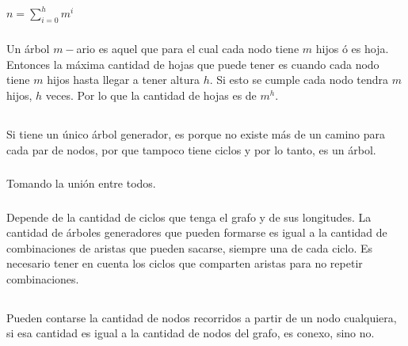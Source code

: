 \subsubsection{}
$n = \sum_{i = 0}^{h}m^i$

\subsubsection{}
Un árbol $m-$ario es aquel que para el cual cada nodo tiene $m$ hijos ó es hoja. Entonces la máxima cantidad de hojas que puede tener es cuando cada nodo tiene $m$ hijos hasta llegar a tener altura $h$. Si esto se cumple cada nodo tendra $m$ hijos, $h$ veces. Por lo que la cantidad de hojas es de $m^h$.

\setcounter{subsection}{10}
\subsection{}

\subsubsection{}
Si tiene un único árbol generador, es porque no existe más de un camino para cada par de nodos, por que tampoco tiene ciclos y por lo tanto, es un árbol.

\subsubsection{}
Tomando la unión entre todos.

\subsubsection{}
Depende de la cantidad de ciclos que tenga el grafo y de sus longitudes. La cantidad de árboles generadores que pueden formarse es igual a la cantidad de combinaciones de aristas que pueden sacarse, siempre una de cada ciclo. Es necesario tener en cuenta los ciclos que comparten aristas para no repetir combinaciones.

\setcounter{subsection}{16}
\subsection{}

\subsubsection{}
Pueden contarse la cantidad de nodos recorridos a partir de un nodo cualquiera, si esa cantidad es igual a la cantidad de nodos del grafo, es conexo, sino no.

